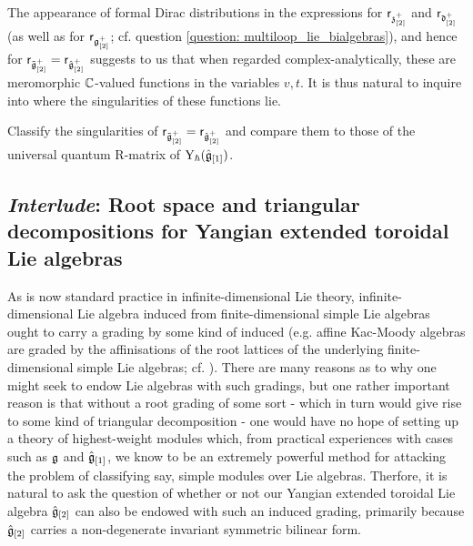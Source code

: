         \begin{remark} \label{remark: toroidal_classical_R_matrices_as_meromorphic_functions}
            The appearance of formal Dirac distributions in the expressions for $\mathsf{r}_{\mathfrak{z}_{[2]}^+}$ and $\mathsf{r}_{\mathfrak{d}_{[2]}^+}$ (as well as for $\mathsf{r}_{\mathfrak{g}_{[2]}^+}$; cf. question \ref{question: multiloop_lie_bialgebras}), and hence for $\mathsf{r}_{\tilde{\mathfrak{g}}_{[2]}^+} = \mathsf{r}_{\hat{\mathfrak{g}}_{[2]}^+}$ suggests to us that when regarded complex-analytically, these are meromorphic $\mathbb{C}$-valued functions in the variables $v, t$. It is thus natural to inquire into where the singularities of these functions lie. 
        \end{remark}
        \begin{question}
            Classify the singularities of $\mathsf{r}_{\tilde{\mathfrak{g}}_{[2]}^+} = \mathsf{r}_{\hat{\mathfrak{g}}_{[2]}^+}$ and compare them to those of the universal quantum R-matrix of $\mathrm{Y}_{\hbar}(\hat{\mathfrak{g}}_{[1]})$. 
        \end{question}

    \subsection{\textit{Interlude}: Root space and triangular decompositions for Yangian extended toroidal Lie algebras}
        As is now standard practice in infinite-dimensional Lie theory, infinite-dimensional Lie algebra induced from finite-dimensional simple Lie algebras ought to carry a grading by some kind of induced  (e.g. affine Kac-Moody algebras are graded by the affinisations of the root lattices of the underlying finite-dimensional simple Lie algebras; cf. \cite[Chapter 6]{kac_infinite_dimensional_lie_algebras}). There are many reasons as to why one might seek to endow Lie algebras with such gradings, but one rather important reason is that without a root grading of some sort - which in turn would give rise to some kind of triangular decomposition - one would have no hope of setting up a theory of highest-weight modules which, from practical experiences with cases such as $\mathfrak{g}$ and $\hat{\mathfrak{g}}_{[1]}$, we know to be an extremely powerful method for attacking the problem of classifying say, simple modules over Lie algebras. Therfore, it is natural to ask the question of whether or not our Yangian extended toroidal Lie algebra $\hat{\mathfrak{g}}_{[2]}$ can also be endowed with such an induced grading, primarily because $\hat{\mathfrak{g}}_{[2]}$ carries a non-degenerate invariant symmetric bilinear form.


